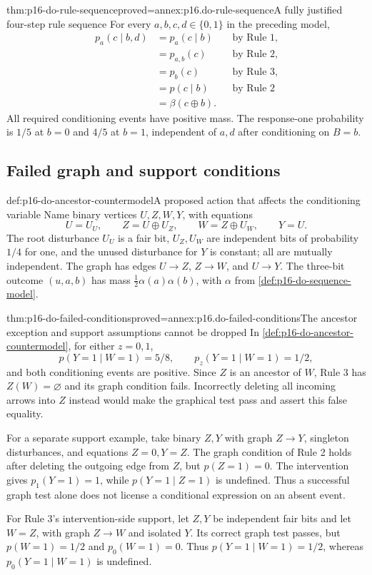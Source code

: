 \begin{hbtheorem}{thm:p16-do-rule-sequence}{proved=annex:p16.do-rule-sequence}{A fully justified four-step rule sequence}
For every \(a,b,c,d\in\{0,1\}\) in the preceding model,
\[
\begin{aligned}
 p_a(c\mid b,d)
 & =p_a(c\mid b) &&\text{by Rule 1},\\
 & =p_{a,b}(c) &&\text{by Rule 2},\\
 & =p_b(c) &&\text{by Rule 3},\\
 & =p(c\mid b) &&\text{by Rule 2}\\
 & =\beta(c\oplus b).
\end{aligned}
\]
All required conditioning events have positive mass. The response-one
probability is \(1/5\) at \(b=0\) and \(4/5\) at \(b=1\),
independent of \(a,d\) after conditioning on \(B=b\).
\end{hbtheorem}

\subsection{Failed graph and support conditions}

\begin{hbdefinition}{def:p16-do-ancestor-countermodel}{A proposed action that affects the conditioning variable}
Name binary vertices \(U,Z,W,Y\), with equations
\[
 U=U_U,\qquad Z=U\oplus U_Z,\qquad
 W=Z\oplus U_W,\qquad Y=U.
\]
The root disturbance \(U_U\) is a fair bit, \(U_Z,U_W\) are
independent bits of probability \(1/4\) for one, and the unused
disturbance for \(Y\) is constant; all are mutually independent.
The graph has edges \(U\to Z\), \(Z\to W\), and \(U\to Y\).
The three-bit outcome \((u,a,b)\) has mass
\(\frac12\alpha(a)\alpha(b)\), with \(\alpha\) from
\cref{def:p16-do-sequence-model}.
\end{hbdefinition}

\begin{hbtheorem}{thm:p16-do-failed-conditions}{proved=annex:p16.do-failed-conditions}{The ancestor exception and support assumptions cannot be dropped}
In \cref{def:p16-do-ancestor-countermodel}, for either \(z=0,1\),
\[
 p(Y=1\mid W=1)=5/8,\qquad p_z(Y=1\mid W=1)=1/2,
\]
and both conditioning events are positive. Since \(Z\) is an
ancestor of \(W\), Rule 3 has \(Z(W)=\varnothing\) and its
graph condition fails. Incorrectly deleting all incoming arrows into
\(Z\) instead would make the graphical test pass and assert this
false equality.

For a separate support example, take binary \(Z,Y\) with graph
\(Z\to Y\), singleton disturbances, and equations \(Z=0,Y=Z\).
The graph condition of Rule 2 holds after deleting the outgoing edge
from \(Z\), but \(p(Z=1)=0\). The intervention gives
\(p_1(Y=1)=1\), while \(p(Y=1\mid Z=1)\) is undefined.
Thus a successful graph test alone does not license a conditional
expression on an absent event.

For Rule 3's intervention-side support, let \(Z,Y\) be independent
fair bits and let \(W=Z\), with graph \(Z\to W\) and isolated
\(Y\). Its correct graph test passes, but \(p(W=1)=1/2\) and
\(p_0(W=1)=0\). Thus \(p(Y=1\mid W=1)=1/2\), whereas
\(p_0(Y=1\mid W=1)\) is undefined.
\end{hbtheorem}

